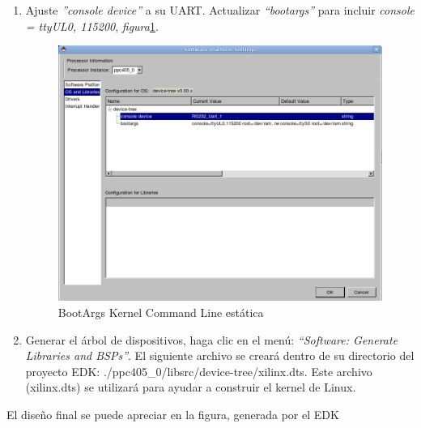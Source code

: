 \begin{enumerate}
  
\item Ajuste \emph{''console device''} a su UART. Actualizar \emph{``bootargs''}
para incluir \emph{console = ttyUL0, 115200}, \emph{figura}\ref{uart}.
  \begin{figure}[h!] 
  \centering
  \includegraphics[scale=.25]{./figuras/uart.png}
  \caption{BootArgs Kernel Command Line estática}
  \label{uart}
  \end{figure}
  
  
\item Generar el árbol de dispositivos, haga clic en el menú: \emph{``Software:
Generate Libraries and BSPs''}. El siguiente archivo se creará dentro de su
directorio del proyecto EDK: ./ppc405\_0/libsrc/device-tree/xilinx.dts. Este
archivo (xilinx.dts) se utilizará para ayudar a construir el kernel de Linux.

\end{enumerate}

El diseño final se puede apreciar en la figura\cite{system}, generada por el EDK

